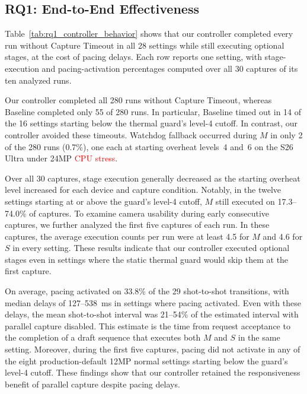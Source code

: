 \subsection{RQ1: End-to-End Effectiveness}
\label{sec:rq1}



Table~\ref{tab:rq1_controller_behavior} shows that our controller completed every run without Capture Timeout in all 28 settings while still executing optional stages, at the cost of pacing delays.
Each row reports one setting, with stage-execution and pacing-activation percentages computed over all 30 captures of its ten analyzed runs.

Our controller completed all 280 runs without Capture Timeout, whereas Baseline completed only 55 of 280 runs.
In particular, Baseline timed out in 14 of the 16 settings starting below the thermal guard's level-4 cutoff.
In contrast, our controller avoided these timeouts.
Watchdog fallback occurred during \(M\) in only 2 of the 280 runs (0.7\%), one each at starting overheat levels~4 and~6 on the S26 Ultra under 24MP \textcolor{red}{CPU stress}.

Over all 30 captures, stage execution generally decreased as the starting overheat level increased for each device and capture condition.
Notably, in the twelve settings starting at or above the guard's level-4 cutoff, \(M\) still executed on 17.3--74.0\% of captures.
To examine camera usability during early consecutive captures, we further analyzed the first five captures of each run.
In these captures, the average execution counts per run were at least 4.5 for \(M\) and 4.6 for \(S\) in every setting.
These results indicate that our controller executed optional stages even in settings where the static thermal guard would skip them at the first capture.

On average, pacing activated on 33.8\% of the 29 shot-to-shot transitions, with median delays of 127--538~ms in settings where pacing activated.
Even with these delays, the mean shot-to-shot interval was 21--54\% of the estimated interval with parallel capture disabled.
This estimate is the time from request acceptance to the completion of a draft sequence that executes both \(M\) and \(S\) in the same setting.
Moreover, during the first five captures, pacing did not activate in any of the eight production-default 12MP normal settings starting below the guard's level-4 cutoff.
These findings show that our controller retained the responsiveness benefit of parallel capture despite pacing delays.
